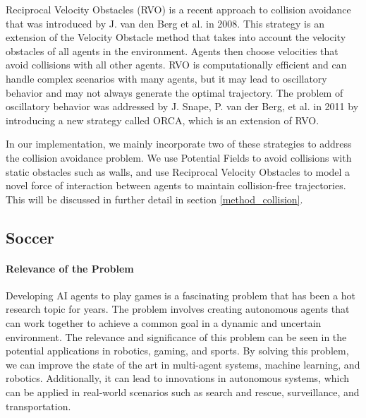\documentclass[a4paper,12pt]{article}
\begin{document}
{Reciprocal Velocity Obstacles (RVO)} is a recent approach to collision avoidance that was introduced by J. van den Berg et al.\cite{Berg2008ReciprocalVO} in 2008. This strategy is an extension of the Velocity Obstacle method that takes into account the velocity obstacles of all agents in the environment. Agents then choose velocities that avoid collisions with all other agents. RVO is computationally efficient and can handle complex scenarios with many agents, but it may lead to oscillatory behavior and may not always generate the optimal trajectory. The problem of oscillatory behavior was addressed by J. Snape, P. van der Berg, et al. in 2011\cite{Snape2011TheHR} by introducing a new strategy called ORCA, which is an extension of RVO.



In our implementation, we mainly incorporate two of these strategies to address the collision avoidance problem. We use Potential Fields to avoid collisions with static obstacles such as walls, and use Reciprocal Velocity Obstacles to model a novel force of interaction between agents to maintain collision-free trajectories. This will be discussed in further detail in section \ref{method_collision}.

\subsection{Soccer}
\label{rel_work_soccer}

\paragraph{Relevance of the Problem}
Developing AI agents to play games is a fascinating problem that has been a hot research topic for years. The problem involves creating autonomous agents that can work together to achieve a common goal in a dynamic and uncertain environment. The relevance and significance of this problem can be seen in the potential applications in robotics, gaming, and sports. By solving this problem, we can improve the state of the art in multi-agent systems, machine learning, and robotics. Additionally, it can lead to innovations in autonomous systems, which can be applied in real-world scenarios such as search and rescue, surveillance, and transportation.
\end{document}
